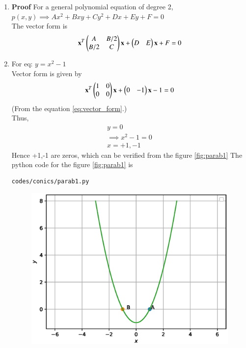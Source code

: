 \renewcommand{\theequation}{\theenumi}
\begin{enumerate}[label=\arabic*.,ref=\thesubsubsection.\theenumi]
\item \textbf{Proof} For a general polynomial equation of degree 2,
\\
$p(x,y) \implies Ax^2+Bxy+Cy^2+Dx+Ey+F=0$
\\
The vector form is 
\begin{align}
\label{eq:vector_form}
\mathbf{x}^T \begin{pmatrix}A & B/2\\B/2 & C\end{pmatrix}\mathbf{x}+ \begin{pmatrix}D & E\end{pmatrix}\mathbf{x}+F=0
\end{align}
\item For eq: $ y = x^2 - 1$
\\
Vector form is given by
\begin{align}
\mathbf{x}^T \begin{pmatrix}1 & 0\\0 & 0\end{pmatrix}\mathbf{x}+\begin{pmatrix}0 & -1\end{pmatrix}\mathbf{x}-1=0
\end{align}
(From the equation \ref{eq:vector_form}.)
\\
Thus,
\begin{align}
y=0
\\
\implies x^2-1=0
\\
x=+1,-1
\end{align}
Hence +1,-1 are zeros, which can be verified from the figure \ref{fig:parab1}
The python code for the figure \ref{fig:parab1} is
\begin{lstlisting}
codes/conics/parab1.py
\end{lstlisting}
\begin{figure}[!ht]
\includegraphics[width=\columnwidth]{./figs/conics/parabola1.eps}

\end{figure}
\end{enumerate}
